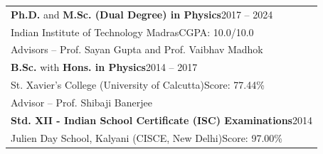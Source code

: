 
\noindent
\begin{tabular}{@{} m{}}

\textbf{Ph.D.} and \textbf{M.Sc. (Dual Degree) in Physics}\hfill 2017 -- 2024\\
\textcolor{mygray2}{Indian Institute of Technology Madras}\hfill {CGPA: 10.0/10.0}\\ 
\textcolor{mygray2}{Advisors -- \textcolor{mentors}{Prof. Sayan Gupta} and \textcolor{mentors}{Prof. Vaibhav Madhok}}\\[0.175cm]

\textbf{B.Sc.} with \textbf{Hons. in Physics}\hfill 2014 -- 2017\\
\textcolor{mygray2}{St. Xavier's College (University of Calcutta)}\hfill {Score: 77.44\%}\\
\textcolor{mygray2}{Advisor -- \textcolor{mentors}{Prof. Shibaji Banerjee}}\\[0.175cm]

\textbf{Std. XII - Indian School Certificate (ISC) Examinations}\hfill 2014\\
\textcolor{mygray2}{Julien Day School, Kalyani (CISCE, New Delhi)}\hfill {Score: 97.00\%}\\[0.175cm]
\end{tabular}